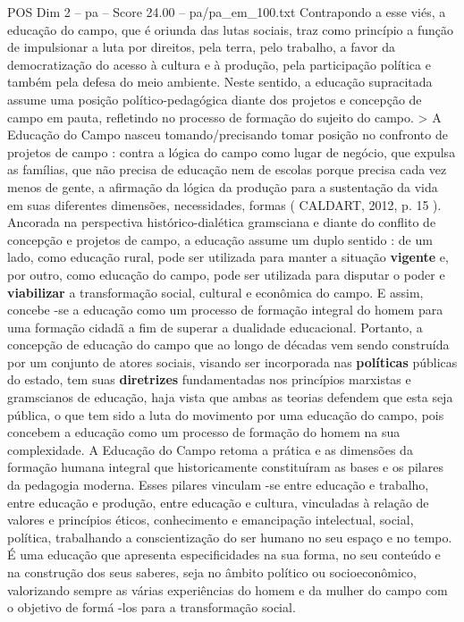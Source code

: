 \begin{textsample}{POS Dim 2 – pa – Score 24.00 – pa/pa\_em\_100.txt}
Contrapondo a esse viés, a educação do campo, que é oriunda das lutas sociais, traz como princípio a função de impulsionar a luta por direitos, pela terra, pelo trabalho, a favor da democratização do acesso à cultura e à produção, pela participação política e também pela defesa do meio ambiente.
Neste sentido, a educação supracitada assume uma posição político-pedagógica diante dos projetos e concepção de campo em pauta, refletindo no processo de formação do sujeito do campo. > A Educação do Campo nasceu tomando/precisando tomar posição no confronto de projetos de campo : contra a lógica do campo como lugar de negócio, que expulsa as famílias, que não precisa de educação nem de escolas porque precisa cada vez menos de gente, a afirmação da lógica da produção para a sustentação da vida em suas diferentes dimensões, necessidades, formas ( CALDART, 2012, p. 15 ).
Ancorada na perspectiva histórico-dialética gramsciana e diante do conflito de concepção e projetos de campo, a educação assume um duplo sentido : de um lado, como educação rural, pode ser utilizada para manter a situação \textbf{vigente} e, por outro, como educação do campo, pode ser utilizada para disputar o poder e \textbf{viabilizar} a transformação social, cultural e econômica do campo.
E assim, concebe -se a educação como um processo de formação integral do homem para uma formação cidadã a fim de superar a dualidade educacional.
Portanto, a concepção de educação do campo que ao longo de décadas vem sendo construída por um conjunto de atores sociais, visando ser incorporada nas \textbf{políticas} públicas do estado, tem suas \textbf{diretrizes} fundamentadas nos princípios marxistas e gramscianos de educação, haja vista que ambas as teorias defendem que esta seja pública, o que tem sido a luta do movimento por uma educação do campo, pois concebem a educação como um processo de formação do homem na sua complexidade.
A Educação do Campo retoma a prática e as dimensões da formação humana integral que historicamente constituíram as bases e os pilares da pedagogia moderna.
Esses pilares vinculam -se entre educação e trabalho, entre educação e produção, entre educação e cultura, vinculadas à relação de valores e princípios éticos, conhecimento e emancipação intelectual, social, política, trabalhando a conscientização do ser humano no seu espaço e no tempo.
É uma educação que apresenta especificidades na sua forma, no seu conteúdo e na construção dos seus saberes, seja no âmbito político ou socioeconômico, valorizando sempre as várias experiências do homem e da mulher do campo com o objetivo de formá -los para a transformação social.

\end{textsample}
